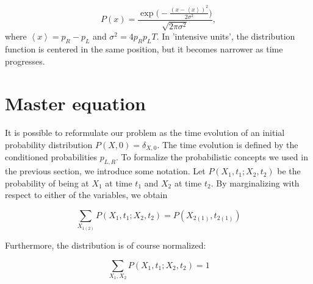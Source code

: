 \documentclass[10pt]{article}
\begin{document}
\begin{equation}
P (x) = \frac{ \exp \bigg( -\frac{(x - \left\langle x \right \rangle)^2}{2\sigma^2} \bigg)}{\sqrt{2\pi \sigma^2}} , 
\end{equation}
where $\left\langle x \right\rangle = p_R - p_L$ and $\sigma^2 = 4 p_R p_L T$. In 'intensive units', the distribution function is centered in the same position, but it becomes narrower as time progresses.

\section{Master equation}\paragraph{}

It is possible to reformulate our problem as the time evolution of an initial probability distribution $P (X, 0) = \delta_{X, 0}$. The time evolution is defined by the conditioned probabilities $p_{L,R}$. To formalize the probabilistic concepts we used in the previous section, we introduce some notation. Let $P(X_1, t_1; X_2, t_2)$ be the probability of being at $X_1$ at time $t_1$ and $X_2$ at time $t_2$. By marginalizing with respect to either of the variables, we obtain

\begin{equation}
\sum_{X_{1(2)}} P ( X_1, t_1 ; X_2, t_2 ) = P ( X_{2(1)} , t_{2(1)} )
\end{equation}

Furthermore, the distribution is of course normalized:

\begin{equation}
\sum_{X_1, X_2} P ( X_1, t_1 ; X_2, t_2 ) = 1
\end{equation}
\end{document}
